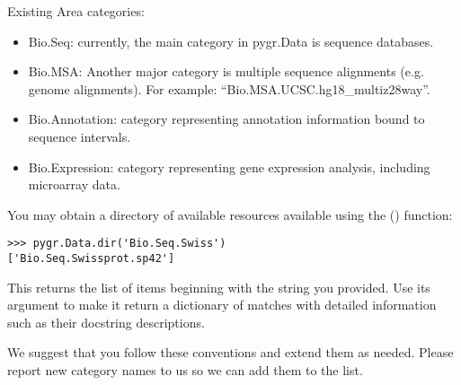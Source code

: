 \documentclass{howto}
\begin{document}
Existing Area categories:
\begin{itemize}
\item Bio.Seq: currently, the main category in pygr.Data is sequence databases.
\item Bio.MSA: Another major category is multiple sequence alignments (e.g. genome alignments).
For example: ``Bio.MSA.UCSC.hg18_multiz28way''.
\item Bio.Annotation: category representing annotation information bound
to sequence intervals.
\item Bio.Expression: category representing gene expression analysis,
including microarray data.
\end{itemize}
You may obtain a directory of available resources available using
the () function:
\begin{verbatim}
>>> pygr.Data.dir('Bio.Seq.Swiss')
['Bio.Seq.Swissprot.sp42']
\end{verbatim}
This returns the list of items beginning with the string
you provided.  Use its  argument to make it return a dictionary
of matches with detailed information such as their docstring descriptions.

We suggest that you follow these conventions and extend them as needed.
Please report new category names to us so we can add them to the list.
\end{document}
